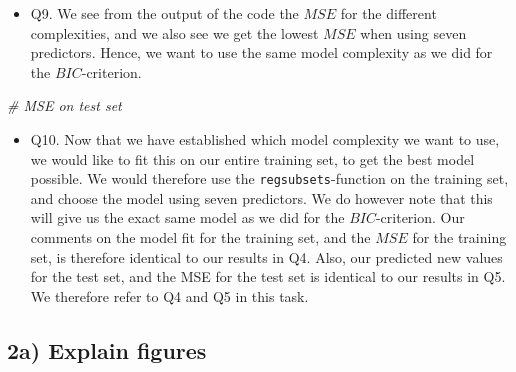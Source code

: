 \documentclass[]{article}
\newenvironment{Shaded}{\begin{snugshade}}{\end{snugshade}}
\newcommand{\CommentTok}[1]{\textcolor[rgb]{0.56,0.35,0.01}{\textit{#1}}}
\providecommand{\tightlist}{%
  \setlength{\itemsep}{0pt}\setlength{\parskip}{0pt}}
\begin{document}
\begin{itemize}
\tightlist
\item
  Q9. We see from the output of the code the \(MSE\) for the different
  complexities, and we also see we get the lowest \(MSE\) when using
  seven predictors. Hence, we want to use the same model complexity as
  we did for the \(BIC\)-criterion.
\end{itemize}

\begin{Shaded}
\begin{Highlighting}[]
\CommentTok{# MSE on test set}
\end{Highlighting}
\end{Shaded}

\begin{itemize}
\tightlist
\item
  Q10. Now that we have established which model complexity we want to
  use, we would like to fit this on our entire training set, to get the
  best model possible. We would therefore use the
  \texttt{regsubsets}-function on the training set, and choose the model
  using seven predictors. We do however note that this will give us the
  exact same model as we did for the \(BIC\)-criterion. Our comments on
  the model fit for the training set, and the \(MSE\) for the training
  set, is therefore identical to our results in Q4. Also, our predicted
  new values for the test set, and the MSE for the test set is identical
  to our results in Q5. We therefore refer to Q4 and Q5 in this task.
\end{itemize}

\subsection{2a) Explain figures}\label{a-explain-figures}
\end{document}
